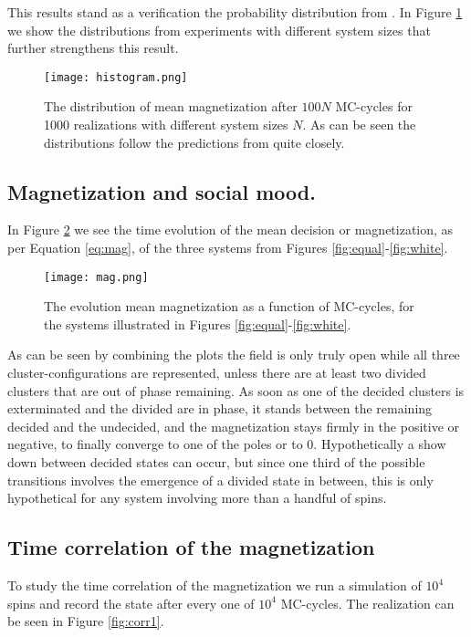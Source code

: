 \documentclass[a4paper]{article}
\begin{document}
This results stand as  a verification the probability distribution from  \cite{opinion}. In Figure \ref{fig:hist} we show the distributions from experiments with different system sizes that further strengthens this result.

\begin{figure}[H]
 \centerline{\texttt{[image: histogram.png]}}
 \caption{The distribution of mean magnetization after $100N$ MC-cycles for 1000 realizations with different system sizes $N$. As can be seen the distributions follow the predictions from \cite{opinion} quite closely.}
 \label{fig:hist}
\end{figure}



\subsection{Magnetization and social mood.}
In Figure \ref{fig:mag} we see the time evolution of the mean decision or magnetization, as per Equation \ref{eq:mag}, of the three systems from Figures \ref{fig:equal}-\ref{fig:white}.  
\begin{figure}[H]
 \centerline{\texttt{[image: mag.png]}}
 \caption{The evolution mean magnetization as a function of MC-cycles, for the systems illustrated in Figures \ref{fig:equal}-\ref{fig:white}.}
 \label{fig:mag}
\end{figure}

As can be seen by combining the plots the field is only truly open while all three cluster-configurations are represented, unless there are at least two divided clusters that are out of phase remaining. As soon as one of the decided clusters is exterminated  and the divided are in phase, it stands between the remaining decided and the undecided, and the magnetization stays firmly in the positive or negative, to finally converge to one of the poles or to 0. Hypothetically a show down between decided states can occur, but since one third of the possible transitions involves the emergence of a divided state in between, this is only hypothetical for any system involving more than a handful of spins.



\subsection{Time correlation of the magnetization}
To study the time correlation of the magnetization we run a simulation of $10^4$ spins and record the state after every one of $10^4$ MC-cycles. The realization can be seen in Figure \ref{fig:corr1}.
\end{document}
